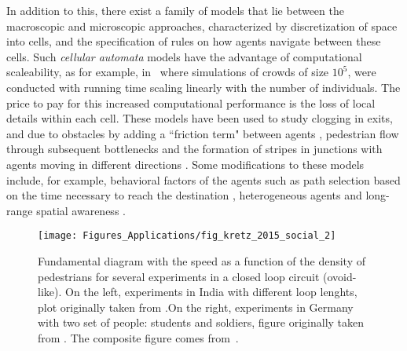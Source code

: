 In addition to this, there exist a family of models that lie between the macroscopic and microscopic approaches, characterized by discretization of space into cells, and the specification of rules on how agents navigate between these cells. Such \emph{cellular automata} models have the advantage of computational scaleability, as for example, in~\cite{dutta_2014_gpu} where simulations of crowds of size $10^5$, were conducted with running time scaling linearly with the number of individuals. The price to pay for this increased computational performance is the loss of local details within each cell. These models have been used to study clogging in exits, and due to obstacles by adding a ``friction term" between agents \cite{kirchner_2003_friction,yanagisawa_2009_introduction}, pedestrian flow through subsequent bottlenecks \cite{ezaki_2012_pedestrian} and the formation of stripes in junctions with agents moving in different directions \cite{cividini_2013_diagonal}.  Some modifications to these models include, for example, behavioral factors of the agents such as path selection based on the time necessary to reach the destination \cite{kirik_2009_shortest}, heterogeneous agents \cite{sarmady_2010_simulating} and long-range spatial awareness \cite{tissera_2014_simulating}.


\begin{figure}[t!]
\centering
\texttt{[image: Figures\_Applications/fig\_kretz\_2015\_social\_2]}
\caption{Fundamental diagram with the speed as a function of the density of pedestrians for several experiments in a closed loop circuit (ovoid-like). On the left, experiments in India with different loop lenghts, plot originally taken from \cite{chattaraj_2009_comparison}.On the right, experiments in Germany with two set of people: students and soldiers, figure originally taken from \cite{protz_2011_analyzing}. The composite figure comes from~\cite{kretz_2015_social}. \label{fig:kretz_2015_social_2}}
\end{figure}



